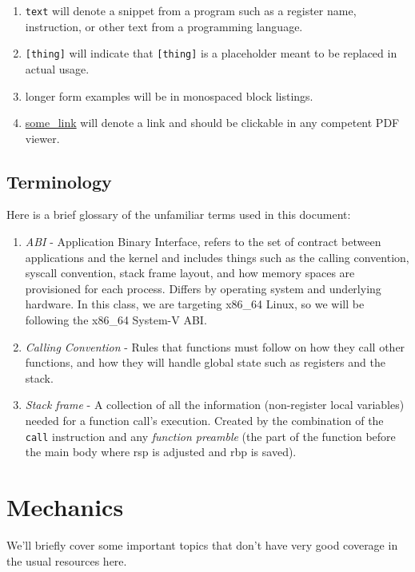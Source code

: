 \documentclass[11pt]{article}
\begin{document}
\begin{enumerate}
    \item \texttt{text} will denote a snippet from a program such as a register name,
        instruction, or other text from a programming language.
    \item \texttt{[thing]} will indicate that \texttt{[thing]} is a placeholder meant to
        be replaced in actual usage.
    \item longer form examples will be in monospaced block listings.
    \item \url{some_link} will denote a link and should be clickable in any competent PDF
        viewer.
\end{enumerate}

\subsection{Terminology}

Here is a brief glossary of the unfamiliar terms used in this document:

\begin{enumerate}
    \item \emph{ABI} - Application Binary Interface, refers to the set of contract between
        applications and the kernel and includes things such as the calling convention,
        syscall convention, stack frame layout, and how memory spaces are provisioned for
        each process. Differs by operating system and underlying hardware. In this class,
        we are targeting x86\_64 Linux, so we will be following the x86\_64 System-V ABI.
    \item \emph{Calling Convention} - Rules that functions must follow on how they call
        other functions, and how they will handle global state such as registers and the
        stack.
    \item \emph{Stack frame} - A collection of all the information (non-register local
        variables) needed for a function call's execution. Created by the combination of the
        \texttt{call} instruction and any \emph{function preamble} (the part of the
        function before the main body where rsp is adjusted and rbp is saved).
\end{enumerate}

\section{Mechanics}

We'll briefly cover some important topics that don't have very good coverage in the usual
resources here.
\end{document}
